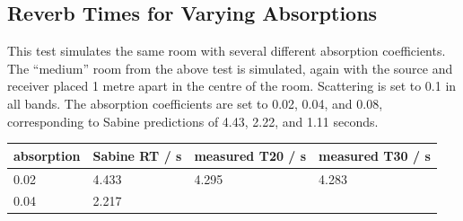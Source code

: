 \documentclass[]{scrreprt}
\begin{document}
\subsection{Reverb Times for Varying
Absorptions}\label{reverb-times-for-varying-absorptions}

This test simulates the same room with several different absorption
coefficients. The ``medium'' room from the above test is simulated,
again with the source and receiver placed 1 metre apart in the centre of
the room. Scattering is set to 0.1 in all bands. The absorption
coefficients are set to 0.02, 0.04, and 0.08, corresponding to Sabine
predictions of 4.43, 2.22, and 1.11 seconds.

\begin{longtable}[c]{@{}llll@{}}
\toprule
\begin{minipage}[b]{0.22\columnwidth}\raggedright\strut
absorption
\strut\end{minipage} &
\begin{minipage}[b]{0.18\columnwidth}\raggedright\strut
Sabine RT / s
\strut\end{minipage} &
\begin{minipage}[b]{0.22\columnwidth}\raggedright\strut
measured T20 / s
\strut\end{minipage} &
\begin{minipage}[b]{0.27\columnwidth}\raggedright\strut
measured T30 / s
\strut\end{minipage}\tabularnewline
\midrule
\endhead
\begin{minipage}[t]{0.22\columnwidth}\raggedright\strut
0.02
\strut\end{minipage} &
\begin{minipage}[t]{0.18\columnwidth}\raggedright\strut
4.433
\strut\end{minipage} &
\begin{minipage}[t]{0.22\columnwidth}\raggedright\strut
4.295
\strut\end{minipage} &
\begin{minipage}[t]{0.27\columnwidth}\raggedright\strut
4.283
\strut\end{minipage}\tabularnewline
\begin{minipage}[t]{0.22\columnwidth}\raggedright\strut
0.04
\strut\end{minipage} &
\begin{minipage}[t]{0.18\columnwidth}\raggedright\strut
2.217
\strut\end{minipage} &
\begin{minipage}[t]{0.22\columnwidth}\raggedright\strut

\end{minipage}
\end{longtable}
\end{document}
